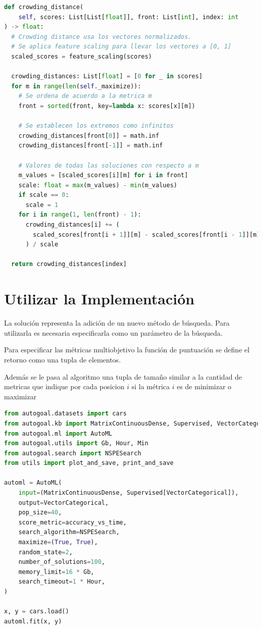 \begin{lstlisting}[caption=Crowding Distance Sorting, language=Python]
def crowding_distance(
    self, scores: List[List[float]], front: List[int], index: int
) -> float:
  # Crowding distance usa los vectores normalizados.
  # Se aplica feature scaling para llevar los vectores a [0, 1]
  scaled_scores = feature_scaling(scores)

  crowding_distances: List[float] = [0 for _ in scores]
  for m in range(len(self._maximize)):
    # Se ordena de acuerdo a la metrica m
    front = sorted(front, key=lambda x: scores[x][m])

    # Se establecen los extremos como infinitos
    crowding_distances[front[0]] = math.inf
    crowding_distances[front[-1]] = math.inf

    # Valores de todas las soluciones con respecto a m 
    m_values = [scaled_scores[i][m] for i in front]
    scale: float = max(m_values) - min(m_values)
    if scale == 0:
      scale = 1
    for i in range(1, len(front) - 1):
      crowding_distances[i] += (
        scaled_scores[front[i + 1]][m] - scaled_scores[front[i - 1]][m]
      ) / scale

  return crowding_distances[index]
\end{lstlisting}

\section{Utilizar la Implementaci\'on}

La soluci\'on representa la adici\'on de un nuevo m\'etodo de b\'usqueda. Para utilizarla es necesaria especificarla como un par\'ametro de la b\'usqueda.

Para especificar las m\'etricas multiobjetivo la funci\'on de puntuaci\'on se define el retorno como una tupla de elementos.

Adem\'as se le pasa al algoritmo una tupla de tama\~no similar a la cantidad de metricas que indique por cada posicion $i$ si la m\'etrica $i$ es de minimizar o maximizar

\begin{lstlisting}[caption=Utilizando NPSGE, language=Python]
from autogoal.datasets import cars
from autogoal.kb import MatrixContinuousDense, Supervised, VectorCategorical
from autogoal.ml import AutoML
from autogoal.utils import Gb, Hour, Min
from autogoal.search import NSPESearch
from utils import plot_and_save, print_and_save

automl = AutoML(
    input=(MatrixContinuousDense, Supervised[VectorCategorical]),
    output=VectorCategorical,
    pop_size=40,
    score_metric=accuracy_vs_time,
    search_algorithm=NSPESearch,
    maximize=(True, True),
    random_state=2,
    number_of_solutions=100,
    memory_limit=16 * Gb,
    search_timeout=1 * Hour,
)

x, y = cars.load()
automl.fit(x, y)


\end{lstlisting}
